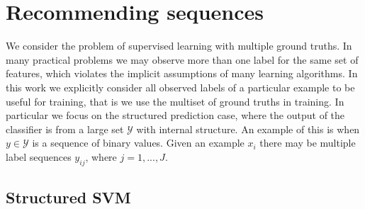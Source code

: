 \section{Recommending sequences}
\label{sec:multiset}

We consider the problem of supervised learning with multiple ground truths. In many practical
problems we may observe more than one label for the same set of features, which violates
the implicit assumptions of many learning algorithms. In this work we explicitly consider
all observed labels of a particular example to be useful for training, that is we use
the multiset of ground truths in training.
In particular we focus on the structured prediction case,
where the output of the classifier is from a large set $\mathcal{Y}$ with internal structure.
An example of this is when $y\in\mathcal{Y}$ is a sequence of binary values.
Given an example $x_i$ there may be multiple label sequences $y_{ij}$, where $j=1,...,J$.


\subsection{Structured SVM}
\label{sec:ssvm}

